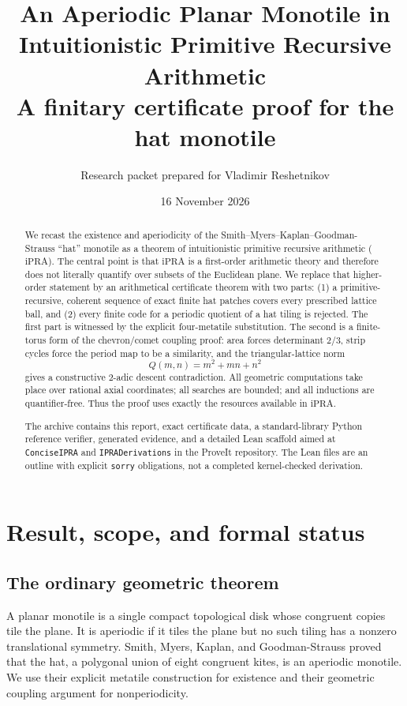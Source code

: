 \documentclass[11pt]{article}
\title{An Aperiodic Planar Monotile in Intuitionistic Primitive Recursive Arithmetic\\
\large A finitary certificate proof for the hat monotile}
\author{Research packet prepared for Vladimir Reshetnikov}
\date{16 November 2026}
\newcommand{\iPRA}{\mathrm{iPRA}}
\begin{document}
\maketitle

\begin{abstract}
We recast the existence and aperiodicity of the Smith--Myers--Kaplan--Goodman-Strauss
``hat'' monotile as a theorem of intuitionistic primitive recursive arithmetic
($\iPRA$).  The central point is that $\iPRA$ is a first-order arithmetic theory and
therefore does not literally quantify over subsets of the Euclidean plane.  We replace
that higher-order statement by an arithmetical certificate theorem with two parts:
(1) a primitive-recursive, coherent sequence of exact finite hat patches covers every
prescribed lattice ball, and (2) every finite code for a periodic quotient of a hat
tiling is rejected.  The first part is witnessed by the explicit four-metatile
substitution.  The second is a finite-torus form of the chevron/comet coupling proof:
area forces determinant $2/3$, strip cycles force the period map to be a similarity,
and the triangular-lattice norm
\[
  Q(m,n)=m^2+mn+n^2
\]
gives a constructive $2$-adic descent contradiction.  All geometric computations take
place over rational axial coordinates; all searches are bounded; and all inductions are
quantifier-free.  Thus the proof uses exactly the resources available in $\iPRA$.

The archive contains this report, exact certificate data, a standard-library Python
reference verifier, generated evidence, and a detailed Lean scaffold aimed at
\texttt{ConciseIPRA} and \texttt{IPRADerivations} in the ProveIt repository.  The Lean
files are an outline with explicit \texttt{sorry} obligations, not a completed
kernel-checked derivation.
\end{abstract}

\tableofcontents

\section{Result, scope, and formal status}

\subsection{The ordinary geometric theorem}
A planar monotile is a single compact topological disk whose congruent copies tile the
plane.  It is aperiodic if it tiles the plane but no such tiling has a nonzero
translational symmetry.  Smith, Myers, Kaplan, and Goodman-Strauss proved that the hat,
a polygonal union of eight congruent kites, is an aperiodic monotile.  We use their
explicit metatile construction for existence and their geometric coupling argument for
nonperiodicity.
\end{document}
